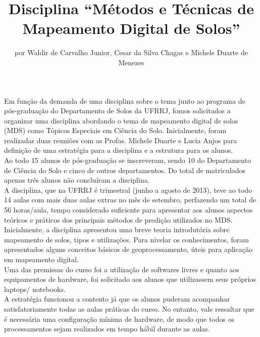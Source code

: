 \title{Disciplina ``Métodos e Técnicas de Mapeamento Digital de Solos''}
\author{por Waldir de Carvalho Junior, Cesar da Silva Chagas e Michele Duarte de Menezes}
\maketitle
Em função da demanda de uma disciplina sobre o tema junto ao programa de pós-graduação do Departamento de Solos da UFRRJ, fomos solicitados a organizar uma  disciplina abordando o tema de mapeamento digital de solos (MDS) como Tópicos Especiais em Ciência do Solo. Inicialmente, foram realizadas duas reuniões com as Profas. Michele Duarte e Lucia Anjos para definição de uma estratégia para a disciplina e a estrutura para os alunos.\\
Ao todo 15 alunos de pós-graduação se inscreveram, sendo 10 do Departamento de Ciência do Solo e cinco de outros departamentos. Do total de matriculados apenas três alunos não concluíram a disciplina.\\
A disciplina, que na UFRRJ é trimestral (junho a agosto de 2013), teve ao todo 14 aulas com mais duas aulas extras no mês de setembro, perfazendo um total de 56 horas/aula, tempo considerado suficiente para apresentar aos alunos aspectos teóricos e práticos dos principais métodos de predição utilizados no MDS.\\
Inicialmente,  a disciplina apresentou uma breve teoria introdutória sobre mapeamento de solos, tipos e utilizações. Para nivelar os conhecimentos, foram apresentados alguns conceitos básicos de geoprocessamento, úteis para aplicação em mapeamento digital.\\
Uma das premissas do curso foi a utilização de softwares livres e quanto aos equipamentos de hardware, foi solicitado aos alunos que utilizassem seus próprios laptops/ notebooks.\\
A estratégia funcionou a contento já que os alunos puderam acompanhar satisfatoriamente todas as aulas práticas do curso. No entanto, vale ressaltar que  é necessária uma configuração mínima de hardware, de modo que todos os processamentos sejam realizados em tempo hábil durante as aulas.\\
\\
